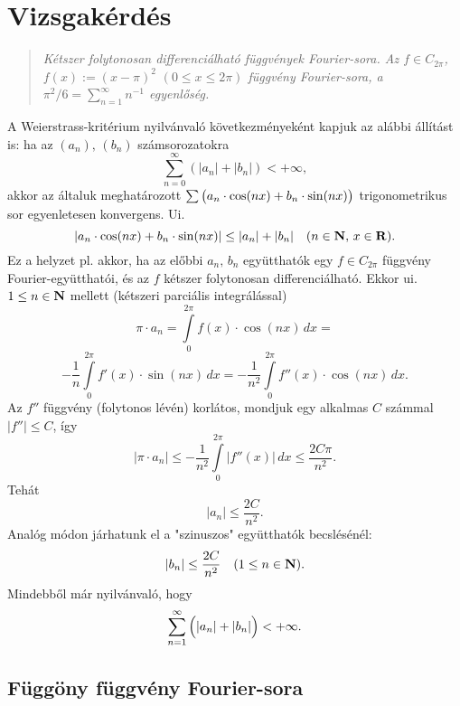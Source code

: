 \newpage
\section{Vizsgakérdés}
\begin{quote}
	\textit{Kétszer folytonosan differenciálható függvények Fourier-sora. Az $f \in C_{2\pi}$, $f(x) := (x - \pi)^2 \, \, (0 \leq x \leq 2\pi)$ függvény Fourier-sora, a $\pi^2 / 6 = \sum_{n=1}^\infty n^{-1}$ egyenlőség.}
\end{quote}

A Weierstrass-kritérium nyilvánvaló következményeként kapjuk az alábbi állítást is: ha az $(a_n), \, (b_n)$ számsorozatokra
\[
	\sum_{n=0}^\infty (|a_n| + |b_n|) < + \infty,
\]
akkor az általuk meghatározott $\sum\big( a_n \cdot \cos(nx) + b_n \cdot \sin(nx) \big)$ trigonometrikus sor egyenletesen konvergens. Ui. 
\[
	|a_n \cdot \cos(nx) + b_n \cdot \sin(nx)| \leq |a_n| + |b_n| \quad (n \in \mathbf{N}, \, x \in \mathbf{R}).
\]
Ez a helyzet pl. akkor, ha az előbbi $a_n, \, b_n$ együtthatók egy $f \in C_{2\pi}$ függvény Fourier-együtthatói, és az $f$ kétszer folytonosan differenciálható. Ekkor ui. $1 \leq n \in \mathbf{N}$ mellett (kétszeri parciális integrálással)
\[
	\pi \cdot a_n = \int\limits_0^{2\pi} f(x) \cdot \cos(nx) \, dx =
\]
\[
	-\frac{1}{n} \int\limits_0^{2\pi} f'(x) \cdot \sin(nx) \, dx = - \frac{1}{n^2} \int\limits_0^{2\pi} f''(x) \cdot \cos(nx) \, dx.
\]
Az $f''$ függvény (folytonos lévén) korlátos, mondjuk egy alkalmas $C$ számmal $|f''| \leq C$, így
\[
	|\pi \cdot a_n| \leq - \frac{1}{n^2} \int\limits_0^{2\pi} |f''(x)| \, dx \leq \frac{2 C \pi}{n^2}.
\]
Tehát
\[
	|a_n| \leq \frac{2C}{n^2}.
\]
Analóg módon járhatunk el a "szinuszos" együtthatók becslésénél:
\[
	|b_n| \leq \frac{2C}{n^2} \quad (1 \leq n \in \mathbf{N}).
\]
Mindebből már nyilvánvaló, hogy
\[
	\sum_{n=1}^\infty \Big(  |a_n| + |b_n|  \Big) < + \infty.
\]

\subsection{Függöny függvény Fourier-sora}

